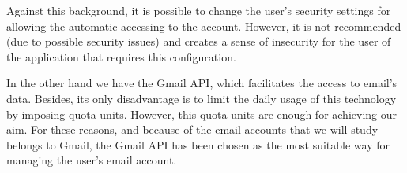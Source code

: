 Against this background, it is possible to change the user's security settings for allowing the automatic accessing to the account. However, it is not recommended (due to possible security issues) and creates a sense of insecurity for the user of the application that requires this configuration.

In the other hand we have the Gmail API, which facilitates the access to email's data. Besides, its only disadvantage is to limit the daily usage of this technology by imposing quota units. However, this quota units are enough for achieving our aim. For these reasons, and because of the email accounts that we will study belongs to Gmail, the Gmail API has been chosen as the most suitable way for managing the user's email account.